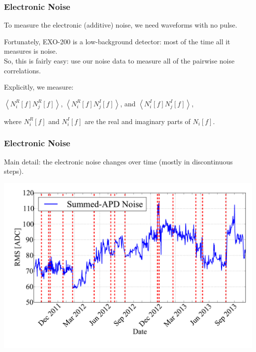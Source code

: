 \documentclass{beamer}
\begin{document}
\begin{frame}
\begin{center}
\frametitle{Electronic Noise}
\end{center}
To measure the electronic (additive) noise, we need waveforms with no pulse.

Fortunately, EXO-200 is a low-background detector: most of the time all it measures is noise.\\[\baselineskip]

So, this is fairly easy: use our noise data to measure all of the pairwise noise correlations.

Explicitly, we measure:\\
\begin{center}
$\left<N_i^R[f]N_j^R[f]\right>$, $\left<N_i^R[f]N_j^I[f]\right>$, and $\left<N_i^I[f]N_j^I[f]\right>$,\\
\end{center}
where $N_i^R[f]$ and $N_i^I[f]$ are the real and imaginary parts of $N_i[f]$.
\end{frame}

\begin{frame}
\begin{center}
\frametitle{Electronic Noise}
\end{center}
\vspace{1cm}
Main detail: the electronic noise changes over time (mostly in discontinuous steps).
\begin{center}
\includegraphics[keepaspectratio=true,width=\textwidth,clip=true,trim=5mm 0mm 0mm 0mm]{APDNoiseVsActions_sumall.pdf}
\end{center}
\end{frame}
\end{document}
